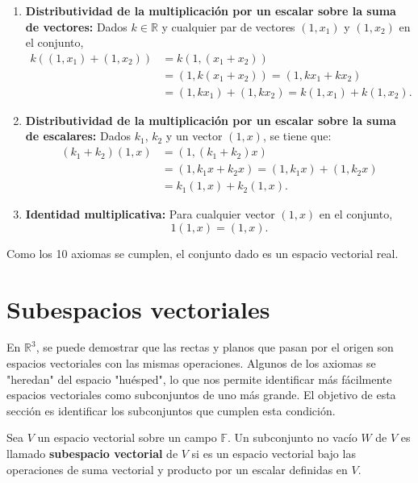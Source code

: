 \begin{example}
\begin{myproof}
\begin{enumerate}[$(a)$]
\begin{enumerate}[$1.$]
\item \textbf{Distributividad de la multiplicación por un escalar sobre la suma de vectores:} Dados $k\in \mathbb{R}$ y cualquier par de vectores $(1,x_1)$ y $(1,x_2)$ en el conjunto, 
\begin{align*}
k((1,x_1)+(1,x_2)) &= k(1,(x_1+x_2))\\
&=(1,k(x_1+x_2))=(1,kx_1+kx_2)\\
&=(1,kx_1)+(1,kx_2)=k(1,x_1)+k(1,x_2).
\end{align*}

\item \textbf{Distributividad de la multiplicación por un escalar sobre la suma de escalares:} Dados $k_1$, $k_2$ y un vector $(1,x)$, se tiene que: 
\begin{align*}
(k_1+k_2)(1,x) &= (1,(k_1+k_2)x)\\
&=(1,k_1x+k_2x)=(1,k_1x)+(1,k_2x)\\
&=k_1(1,x)+k_2(1,x).
\end{align*}

\item \textbf{Identidad multiplicativa:} Para cualquier vector $(1,x)$ en el conjunto, 
$$1(1,x) = (1,x).$$
\end{enumerate}
Como los 10 axiomas se cumplen, el conjunto dado es un espacio vectorial real.
\end{enumerate}

\end{myproof}
\end{example}
    


\section{Subespacios vectoriales}
En $\mathbb{R}^3$, se puede demostrar que las rectas y planos que pasan por el origen son espacios vectoriales con las mismas operaciones. Algunos de los axiomas se "heredan" del espacio "huésped", lo que nos permite identificar más fácilmente espacios vectoriales como subconjuntos de uno más grande. El objetivo de esta sección es identificar los subconjuntos que cumplen esta condición.

\begin{definition}\label{defsubespacio} Sea $V$ un espacio vectorial sobre un campo $\mathbb{F}.$ Un subconjunto no vacío $W$ de $V$ es llamado \textbf{subespacio vectorial} de $V$ si es un espacio vectorial bajo las operaciones de suma vectorial y producto por un escalar definidas en $V.$
\end{definition}

